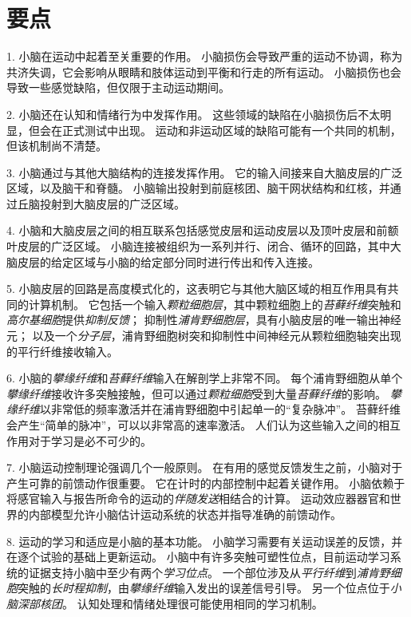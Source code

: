\section{要点}

1. 小脑在运动中起着至关重要的作用。
小脑损伤会导致严重的运动不协调，称为共济失调，它会影响从眼睛和肢体运动到平衡和行走的所有运动。
小脑损伤也会导致一些感觉缺陷，但仅限于主动运动期间。


2. 小脑还在认知和情绪行为中发挥作用。
这些领域的缺陷在小脑损伤后不太明显，但会在正式测试中出现。
运动和非运动区域的缺陷可能有一个共同的机制，但该机制尚不清楚。


3. 小脑通过与其他大脑结构的连接发挥作用。
它的输入间接来自大脑皮层的广泛区域，以及脑干和脊髓。
小脑输出投射到前庭核团、脑干网状结构和红核，并通过丘脑投射到大脑皮层的广泛区域。


4. 小脑和大脑皮层之间的相互联系包括感觉皮层和运动皮层以及顶叶皮层和前额叶皮层的广泛区域。
小脑连接被组织为一系列并行、闭合、循环的回路，其中大脑皮层的给定区域与小脑的给定部分同时进行传出和传入连接。


5. 小脑皮层的回路是高度模式化的，这表明它与其他大脑区域的相互作用具有共同的计算机制。
它包括一个输入\textit{颗粒细胞层}，其中颗粒细胞上的\textit{苔藓纤维}突触和\textit{高尔基细胞}提供\textit{抑制反馈}；
抑制性\textit{浦肯野细胞层}，具有小脑皮层的唯一输出神经元；
以及一个\textit{分子层}，浦肯野细胞树突和抑制性中间神经元从颗粒细胞轴突出现的平行纤维接收输入。


6. 小脑的\textit{攀缘纤维}和\textit{苔藓纤维}输入在解剖学上非常不同。
每个浦肯野细胞从单个\textit{攀缘纤维}接收许多突触接触，但可以通过\textit{颗粒细胞}受到大量\textit{苔藓纤维}的影响。
\textit{攀缘纤维}以非常低的频率激活并在浦肯野细胞中引起单一的“复杂脉冲”。
苔藓纤维会产生“简单的脉冲”，可以以非常高的速率激活。
人们认为这些输入之间的相互作用对于学习是必不可少的。


7. 小脑运动控制理论强调几个一般原则。
在有用的感觉反馈发生之前，小脑对于产生可靠的前馈动作很重要。
它在计时的内部控制中起着关键作用。
小脑依赖于将感官输入与报告所命令的运动的\textit{伴随发送}相结合的计算。
运动效应器器官和世界的内部模型允许小脑估计运动系统的状态并指导准确的前馈动作。


8. 运动的学习和适应是小脑的基本功能。
小脑学习需要有关运动误差的反馈，并在逐个试验的基础上更新运动。
小脑中有许多突触可塑性位点，目前运动学习系统的证据支持小脑中至少有两个\textit{学习位点}。
一个部位涉及从\textit{平行纤维}到\textit{浦肯野细胞}突触的\textit{长时程抑制}，由\textit{攀缘纤维}输入发出的误差信号引导。
另一个位点位于\textit{小脑深部核团}。
认知处理和情绪处理很可能使用相同的学习机制。



